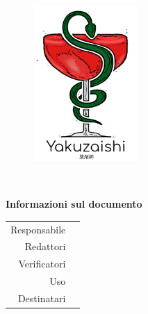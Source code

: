\thispagestyle{empty}

\begin{figure}
	\centering
	\includegraphics[width=150px]{../template/images/logo}
\end{figure}

\hspace{5pt}

\begin{center}
	\textbf{\Large \documentName}\\[0.2cm]
\end{center}

\vspace{5pt}

\begin{center}
	\groupEmail
\end{center}

\vspace{5pt}

\begin{center}
	\textbf{Informazioni sul documento}
\end{center}

\begin{table}[H]
	\centering
	\renewcommand{\arraystretch}{1.4}
	\begin{tabular}{r|l}
		Responsabile & \documentApprovers\vspace{2.5pt}\\
		Redattori & \documentEditors\vspace{2.5pt}\\
		Verificatori & \documentVerifiers\vspace{2.5pt}\\
		Uso & \documentUsage\vspace{2.5pt}\\
		Destinatari & \documentAddressee\\
	\end{tabular}
\end{table}

